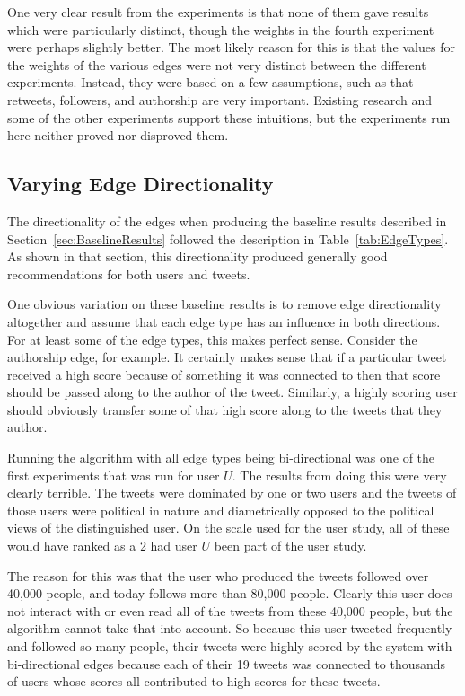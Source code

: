 One very clear result from the experiments is that none of them gave results which were particularly distinct, though the weights in the fourth experiment were perhaps slightly better. The most likely reason for this is that the values for the weights of the various edges were not very distinct between the different experiments. Instead, they were based on a few assumptions, such as that retweets, followers, and authorship are very important. Existing research and some of the other experiments support these intuitions, but the experiments run here neither proved nor disproved them.


\subsection{Varying Edge Directionality}
\label{sec:VaryingEdgeDirectionality}

The directionality of the edges when producing the baseline results described in Section~\ref{sec:BaselineResults} followed the description in Table~\ref{tab:EdgeTypes}. As shown in that section, this directionality produced generally good recommendations for both users and tweets.

One obvious variation on these baseline results is to remove edge directionality altogether and assume that each edge type has an influence in both directions. For at least some of the edge types, this makes perfect sense. Consider the authorship edge, for example. It certainly makes sense that if a particular tweet received a high score because of something it was connected to then that score should be passed along to the author of the tweet. Similarly, a highly scoring user should obviously transfer some of that high score along to the tweets that they author.

Running the algorithm with all edge types being bi-directional was one of the first experiments that was run for user $U$. The results from doing this were very clearly terrible. The tweets were dominated by one or two users and the tweets of those users were political in nature and diametrically opposed to the political views of the distinguished user. On the scale used for the user study, all of these would have ranked as a 2 had user $U$ been part of the user study.

The reason for this was that the user who produced the tweets followed over 40,000 people, and today follows more than 80,000 people. Clearly this user does not interact with or even read all of the tweets from these 40,000 people, but the algorithm cannot take that into account. So because this user tweeted frequently and followed so many people, their tweets were highly scored by the system with bi-directional edges because each of their 19 tweets was connected to thousands of users whose scores all contributed to high scores for these tweets.

